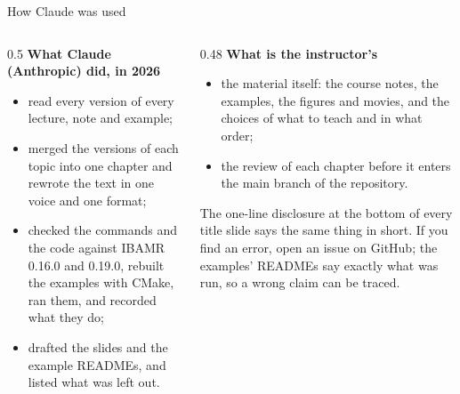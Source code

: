 \documentclass[aspectratio=169,11pt]{beamer}
\begin{document}
\begin{frame}{How Claude was used}
\begin{columns}[T,onlytextwidth]
\begin{column}{0.5\textwidth}
\textbf{What Claude (Anthropic) did, in 2026}
\begin{itemize}
  \item read every version of every lecture, note and example;
  \item merged the versions of each topic into one chapter and rewrote the text in one voice and one format;
  \item checked the commands and the code against IBAMR 0.16.0 and 0.19.0, rebuilt the examples with CMake, ran them, and recorded what they do;
  \item drafted the slides and the example READMEs, and listed what was left out.
\end{itemize}
\end{column}
\begin{column}{0.48\textwidth}
\textbf{What is the instructor's}
\begin{itemize}
  \item the material itself: the course notes, the examples, the figures and movies, and the choices of what to teach and in what order;
  \item the review of each chapter before it enters the main branch of the repository.
\end{itemize}
\vspace{2mm}
\begin{punchbox}
\small The one-line disclosure at the bottom of every title slide says the same thing in short. If you find an error, open an issue on GitHub; the examples' READMEs say exactly what was run, so a wrong claim can be traced.
\end{punchbox}
\end{column}
\end{columns}
\end{frame}
\end{document}
